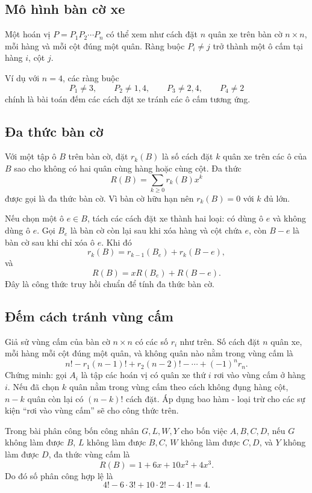 \documentclass[11pt]{article}
\begin{document}
\subsection{Mô hình bàn cờ xe}

Một hoán vị \(P=P_1P_2\cdots P_n\) có thể xem như cách đặt \(n\) quân xe trên
bàn cờ \(n\times n\), mỗi hàng và mỗi cột đúng một quân. Ràng buộc
\(P_i\ne j\) trở thành một ô cấm tại hàng \(i\), cột \(j\).

Ví dụ với \(n=4\), các ràng buộc
\[
  P_1\ne3,\qquad P_2\ne1,4,\qquad
  P_3\ne2,4,\qquad P_4\ne2
\]
chính là bài toán đếm các cách đặt xe tránh các ô cấm tương ứng.

\subsection{Đa thức bàn cờ}

Với một tập ô \(B\) trên bàn cờ, đặt \(r_k(B)\) là số cách đặt \(k\) quân xe
trên các ô của \(B\) sao cho không có hai quân cùng hàng hoặc cùng cột. Đa
thức
\[
  R(B)=\sum_{k\ge0}r_k(B)x^k
\]
được gọi là đa thức bàn cờ. Vì bàn cờ hữu hạn nên \(r_k(B)=0\) với \(k\) đủ
lớn.

Nếu chọn một ô \(e\in B\), tách các cách đặt xe thành hai loại: có dùng ô
\(e\) và không dùng ô \(e\). Gọi \(B_e\) là bàn cờ còn lại sau khi xóa hàng
và cột chứa \(e\), còn \(B-e\) là bàn cờ sau khi chỉ xóa ô \(e\). Khi đó
\[
  r_k(B)=r_{k-1}(B_e)+r_k(B-e),
\]
và
\[
  R(B)=xR(B_e)+R(B-e).
\]
Đây là công thức truy hồi chuẩn để tính đa thức bàn cờ.

\subsection{Đếm cách tránh vùng cấm}

Giả sử vùng cấm của bàn cờ \(n\times n\) có các số \(r_i\) như trên. Số cách
đặt \(n\) quân xe, mỗi hàng mỗi cột đúng một quân, và không quân nào nằm trong
vùng cấm là
\[
  n!-r_1(n-1)!+r_2(n-2)!-\cdots+(-1)^n r_n.
\]
Chứng minh: gọi \(A_i\) là tập các hoán vị có quân xe thứ \(i\) rơi vào vùng
cấm ở hàng \(i\). Nếu đã chọn \(k\) quân nằm trong vùng cấm theo cách không
đụng hàng cột, \(n-k\) quân còn lại có \((n-k)!\) cách đặt. Áp dụng
bao hàm - loại trừ cho các sự kiện ``rơi vào vùng cấm'' sẽ cho công thức trên.

Trong bài phân công bốn công nhân \(G,L,W,Y\) cho bốn việc \(A,B,C,D\), nếu
\(G\) không làm được \(B\), \(L\) không làm được \(B,C\), \(W\) không làm được
\(C,D\), và \(Y\) không làm được \(D\), đa thức vùng cấm là
\[
  R(B)=1+6x+10x^2+4x^3.
\]
Do đó số phân công hợp lệ là
\[
  4!-6\cdot3!+10\cdot2!-4\cdot1!=4.
\]
\end{document}

